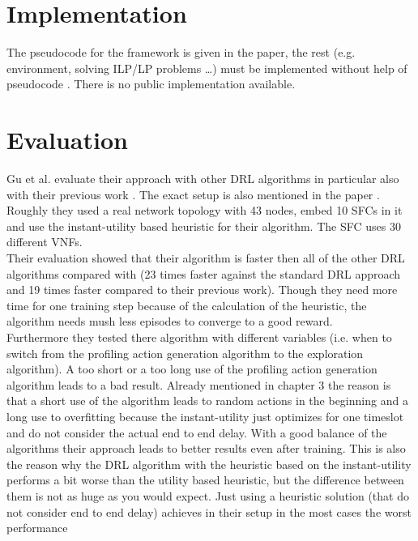 \section {Implementation}
The pseudocode for the framework is given in the paper, the rest (e.g. environment, solving ILP/LP problems \dots) must be implemented without help of pseudocode \cite{Gu}. There is no public implementation available.


\section{Evaluation}%
\label{sec:evaluation}
Gu et al. \cite{Gu} evaluate their approach with other DRL algorithms in particular also with their previous work \cite{Guz}. The exact setup is also mentioned in the paper \cite{Gu}. Roughly they used a real network topology with 43 nodes, embed 10 SFCs in it and use the instant-utility based heuristic for their algorithm. The SFC uses 30 different VNFs.\\
Their evaluation showed that their algorithm is faster then all of the other DRL algorithms compared with (23 times faster against the standard DRL approach and 19 times faster compared to their previous work). Though they need more time for one training step because of the calculation of the heuristic, the algorithm needs mush less episodes to converge to a good reward.\\
Furthermore they tested there algorithm with different variables (i.e. when to switch from the profiling action generation algorithm to the exploration algorithm). A too short or a too long use of the profiling action generation algorithm leads to a bad result. Already mentioned in chapter 3 %
the reason is that a short use of the algorithm leads to random actions in the beginning and a long use to overfitting because the instant-utility just optimizes for one timeslot and do not consider the actual end to end delay. With a good balance of the algorithms their approach leads to better results even after training. This is also the reason why the DRL algorithm with the heuristic based on the instant-utility performs a bit worse than the utility based heuristic, but the difference between them is not as huge as you would expect. Just using a heuristic solution (that do not consider end to end delay) achieves in their setup in the most cases the worst performance




